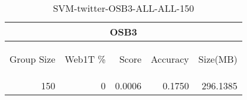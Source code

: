 \begin{center}
\begin{table}[htbp] 
 \begin{center}
\begin{tabular}{ | r | r | r | r | r |}
\hline
\multicolumn{5}{|c|}{OSB3}\\
\hline
\begin{sideways}Group Size\end{sideways} & \begin{sideways}Web1T \%\end{sideways} & \begin{sideways}Score\end{sideways} & \begin{sideways}Accuracy\end{sideways} & \begin{sideways}Size(MB)\end{sideways}\\
\hline
\multirow{0}{*}{150}
 & 0 & 0.0006 & 0.1750 & 296.1385\\ \cline{2-5}
\hline
\end{tabular}
\caption{SVM-twitter-OSB3-ALL-ALL-150}
\label{table:SVM-twitter-OSB3-ALL-ALL-150}
\end{center}
 \end{table}
\end{center}

